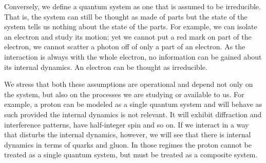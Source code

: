 \documentclass{ws-ijqi}
\begin{document}
Conversely, we define a quantum system as one that is assumed to be irreducible. That is, the system can still be thought as made of parts but the state of the system tells us nothing about the state of the parts. For example, we can isolate an electron and study its motion; yet we cannot put a red mark on part of the electron, we cannot scatter a photon off of only a part of an electron. As the interaction is always with the whole electron, no information can be gained about its internal dynamics. An electron can be thought as irreducible.

We stress that both these assumptions are operational and depend not only on the system, but also on the processes we are studying or available to us. For example, a proton can be modeled as a single quantum system and will behave as such provided the internal dynamics is not relevant. It will exhibit diffraction and interference patterns, have half-integer spin and so on. If we interact in a way that disturbs the internal dynamics, however, we will see that there is internal dynamics in terms of quarks and gluon. In those regimes the proton cannot be treated as a single quantum system, but must be treated as a composite system.
\end{document}

